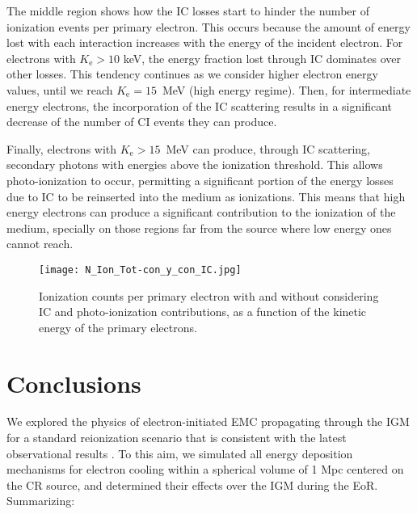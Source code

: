 \documentclass[baaa]{baaa}
\begin{document}
The middle region shows how the IC losses start to hinder the number of ionization events per primary electron. This occurs because the amount of energy lost with each interaction increases with the energy of the incident electron. For electrons with $K_{\mathrm{e}} > 10$ keV, the energy fraction lost through IC dominates over other losses. This tendency continues as we consider higher electron energy values, until we reach $K_{\mathrm{e}} = 15$~MeV (high energy regime). Then, for intermediate energy electrons, the incorporation of the IC scattering results in a significant decrease of the number of CI events they can produce.  

Finally, electrons with $K_{\mathrm{e}} > 15$~MeV can produce, through IC scattering, secondary photons with energies above the ionization threshold. This allows photo-ionization to occur, permitting a significant portion of the energy losses due to IC to be reinserted into the medium as ionizations. This means that high energy electrons can produce a significant contribution to the ionization of the medium, specially on those regions far from the source where low energy ones  cannot reach.



\begin{figure}[!t]
\centering
\texttt{[image: N\_Ion\_Tot-con\_y\_con\_IC.jpg]}
\caption{Ionization counts per primary electron with and without considering IC and photo-ionization contributions, as a function of the kinetic energy of the primary electrons.}
\label{N_ion}
\end{figure}



\section{Conclusions}

We explored the physics of electron-initiated EMC propagating through the IGM for a standard reionization scenario that is consistent with the latest observational results \citep{Wise2019}. To this aim, we simulated all energy deposition mechanisms for electron cooling within a spherical volume of 1 Mpc centered on the CR source, and determined their effects over the IGM during the EoR. Summarizing:
\end{document}
